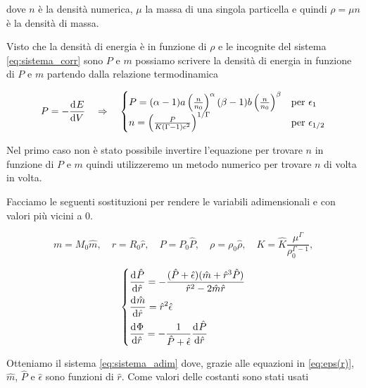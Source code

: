 \documentclass[a4paper, titlepage]{article}
\begin{document}
dove $n$ è la densità numerica, $\mu$ la massa di una singola particella e quindi $\rho = \mu n$ è la densità di massa.


Visto che la densità di energia è in funzione di $\rho$ e le incognite del sistema \ref{eq:sistema_corr} sono $P$ e $m$ possiamo scrivere la densità di energia in funzione di $P$ e $m$ partendo dalla relazione termodinamica

\begin{equation}
    P = - \dv[]{E}{V} \quad \Rightarrow \quad
    \begin{cases}
        P = (\alpha - 1) a \left( \frac{n}{n_0} \right)^{\alpha} (\beta - 1) b \left( \frac{n}{n_0} \right)^{\beta} & \text{per } \epsilon_1 \\
        n = \left( \frac{P}{K(\Gamma - 1) c^2} \right) ^ {1 / \Gamma} & \text{per } \epsilon_{1/2}
    \end{cases}
    \label{eq:eps(r)}
\end{equation}

Nel primo caso non è stato possibile invertire l'equazione per trovare $n$ in funzione di $P$ e $m$ quindi utilizzeremo un metodo numerico per trovare $n$ di volta in volta.


Facciamo le seguenti sostituzioni per rendere le variabili adimensionali e con valori più vicini a 0.

\begin{equation*}
    m=M_0\hat m, \quad 
    r=R_0\hat r, \quad 
    P=P_0\hat P, \quad
    \rho=\rho_0 \hat{\rho}, \quad
    K = \hat{K}\frac{\mu^\Gamma}{\rho_0^{\Gamma-1}},
\end{equation*}

\begin{equation}
    \begin{dcases}
        \dv[]{\hat P}{\hat r} = - \frac{(\hat P + \hat{\epsilon})(\hat m + \hat r^3 \hat P)}{\hat r^2-2\hat m\hat r}\\
        \dv[]{\hat m}{\hat r} = \hat r^2 \hat{\epsilon} \\
        \dv[]{\Phi}{\hat r} = - \frac{1}{\hat P + \hat{\epsilon}} \dv[]{\hat P}{\hat r}
    \end{dcases}
    \label{eq:sistema_adim}
\end{equation}

Otteniamo il sistema \ref{eq:sistema_adim} dove, grazie alle equazioni in \ref{eq:eps(r)}, $\hat m$, $\hat P$ e $\hat{\epsilon}$ sono funzioni di $\hat r$. Come valori delle costanti sono stati usati
\end{document}
